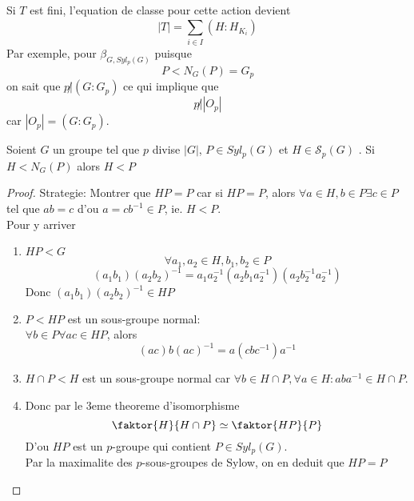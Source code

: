 \documentclass[../main.tex]{subfiles}
\begin{document}
Si $T$ est fini, l'equation de classe pour cette action devient
\[ 
|T| = \sum_{i\in I}^{  } ( H: H_{K_i} ) 
\]
Par exemple, pour $\beta_{G, Syl_{p} ( G) } $ puisque
\[ 
 P < N_G( P) = G_p
\]
on sait que $p \not| ( G:G_p) $ ce qui implique que
\[ 
p \not | | O_p| 
\]
car $| O_p| = ( G:G_p) $.\\
\begin{lemma}
Soient $G$ un groupe tel que $p$  divise $|G|$, $P \in Syl_p( G) $ et $H \in \mathcal{S}_p( G)$ . Si $H < N_G( P) $ alors $H<P$ 
\end{lemma}
\begin{proof}
Strategie: Montrer que $HP = P$ car si $HP = P$, alors $\forall a \in H, b \in P \exists c \in P$ tel que $ab= c$ d'ou $ a= cb^{-1}\in P$, ie. $H < P$.\\
Pour y arriver
\begin{enumerate}
\item $HP < G $ 
	\[ 
	\forall a_1, a_2 \in H, b_1,b_2\in P
	\]
	\[ 
		( a_1b_1) ( a_2b_2)^{-1} = a_1 a_2^{-1}( a_2b_1a_2^{-1}) ( a_2b_2^{-1}a_2^{-1}) 
	\]
	Donc $( a_1b_1) ( a_2b_2)^{-1}\in HP$ 
\item $P < HP$ est un sous-groupe normal:\\
	$\forall b \in P\forall ac \in HP$, alors 
	\[ 
		( ac) b ( ac)^{-1}= a( cbc^{-1}) a^{-1}
	\]
	
\item $H \cap P < H$ est un sous-groupe normal car $\forall b \in H\cap P, \forall a \in H: aba^{-1}\in H\cap P$.

\item Donc par le 3eme theoreme d'isomorphisme 
	\[ 
	 \faktor{H}{H\cap P} \simeq \faktor{HP}{P}	
	\]
D'ou $HP$ est un $p$-groupe qui contient $P \in Syl_p( G) $.\\
Par la maximalite des $p$-sous-groupes de Sylow, on en deduit que $HP= P$ 
	
\end{enumerate}

\end{proof}
\end{document}
